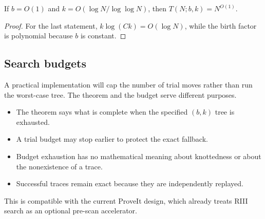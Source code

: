 \begin{corollary}
\label{cor:polynomial-island}
If $b=O(1)$ and
$k=O(\log N/\log\log N)$, then $T(N;b,k)=N^{O(1)}$.
\end{corollary}

\begin{proof}
For the last statement,
$k\log(Ck)=O(\log N)$, while the birth factor is polynomial because $b$ is
constant.
\end{proof}

\subsection{Search budgets}

A practical implementation will cap the number of trial moves rather than run
the worst-case tree.  The theorem and the budget serve different purposes.

\begin{itemize}
\item The theorem says what is complete when the specified $(b,k)$ tree is
      exhausted.
\item A trial budget may stop earlier to protect the exact fallback.
\item Budget exhaustion has no mathematical meaning about knottedness or about
      the nonexistence of a trace.
\item Successful traces remain exact because they are independently replayed.
\end{itemize}

This is compatible with the current ProveIt design, which already treats RIII
search as an optional pre-scan accelerator.
